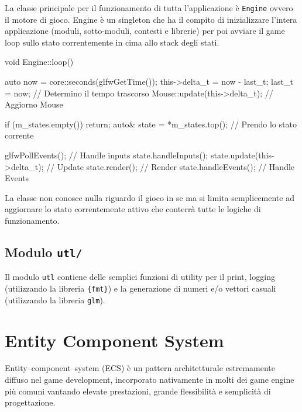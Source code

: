 La classe principale per il funzionamento di tutta l'applicazione è \texttt{Engine} ovvero il motore di gioco. Engine è un singleton che ha il compito di inizializzare l'intera applicazione (moduli, sotto-moduli, contesti e librerie) per poi avviare il game loop sullo stato correntemente in cima allo stack degli stati.

\begin{cpp}[caption={Funzione che esegue un singolo loop di gioco. Una volta determinato il 
 tempo trascorso dall'ultima iterazione in ordine: si effettua il polling degli eventi (glfw), si gestisce l'input, si aggiorna lo stato interno, si effettua il rendering ed in fine si gestiscono gli eventi di gioco.
}, captionpos=t]
void Engine::loop() {
	auto now = core::seconds(glfwGetTime());  
	this->delta_t = now - last_t;
	last_t = now;                  // Determino il tempo trascorso
	Mouse::update(this->delta_t);  // Aggiorno Mouse
	
	if (m_states.empty()) return;
	auto& state = *m_states.top(); // Prendo lo stato corrente
	
	glfwPollEvents();              // Handle inputs
	state.handleInputs();
	state.update(this->delta_t);   // Update
	state.render();                // Render
	state.handleEvents();          // Handle Events
}
\end{cpp}

La classe non conosce nulla riguardo il gioco in se ma si limita semplicemente ad aggiornare lo stato correntemente attivo che conterrà tutte le logiche di funzionamento.

\subsection{Modulo \texttt{utl/}}
Il modulo \texttt{utl} contiene delle semplici funzioni di utility per il print, logging (utilizzando la libreria \texttt{\{fmt\}}) e la generazione di numeri e/o vettori casuali (utilizzando la libreria \texttt{glm}).

\section{Entity Component System}
\label{sec::ecs}
Entity–component–system (ECS) è un pattern architetturale estremamente diffuso nel game development,  incorporato nativamente in molti dei game engine più comuni vantando elevate prestazioni, grande flessibilità e semplicità di progettazione. 

